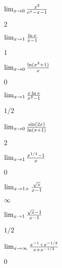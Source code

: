\begin{exercises}
\begin{exercise} $\lim_{x\to0}{x^2\over e^x-x-1}$
\begin{answer} $2$
\end{answer}\end{exercise}

\begin{exercise} $\lim_{x\to1}{\ln x\over x-1}$
\begin{answer} $1$
\end{answer}\end{exercise}

\begin{exercise} $\lim_{x\to0}{\ln(x^2+1)\over x}$
\begin{answer} $0$
\end{answer}\end{exercise}

\begin{exercise} $\lim_{x\to1}{x\ln x\over x^2-1}$
\begin{answer} $1/2$
\end{answer}\end{exercise}

\begin{exercise} $\lim_{x\to0}{\sin(2x)\over\ln(x+1)}$
\begin{answer} $2$
\end{answer}\end{exercise}

\begin{exercise} $\lim_{x\to1}{x^{1/4}-1\over x}$
\begin{answer} $0$
\end{answer}\end{exercise}

\begin{exercise} $\lim_{x\to1+}{\sqrt{x}\over x-1}$
\begin{answer} $\infty$
\end{answer}\end{exercise}

\begin{exercise} $\lim_{x\to1}{\sqrt{x}-1\over x-1}$
\begin{answer} $1/2$
\end{answer}\end{exercise}

\begin{exercise} $\lim_{x\to\infty}{x^{-1}+x^{-1/2}\over x+x^{-1/2}}$
\begin{answer} $0$
\end{answer}\end{exercise}


\end{exercises}
